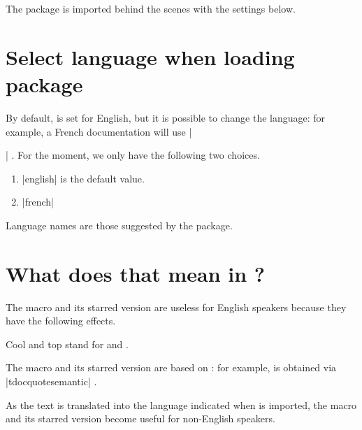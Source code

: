 The  package is imported behind the scenes with the settings below.


\begin{tdoclatex}[code]
\hypersetup{
  colorlinks,
  citecolor = orange!75!black,
  filecolor = orange!75!black,
  linkcolor = orange!75!black,
  urlcolor  = orange!75!black
}
\end{tdoclatex}


\section{Select language when loading package}

By default, \thispack{} is set for English, but it is possible to change the language: for example, a French documentation will use \tdocinlatex|\usepackage[lang = french]{tutodoc}| .
For the moment, we only have the following two choices.

\begin{enumerate}
    \item \tdocinlatex|english| is the default value.

    \item \tdocinlatex|french|
\end{enumerate}


\begin{tdocnote}
    Language names are those suggested by the  package.
\end{tdocnote}


\section{What does that mean in ?}

The macro  and its starred version are useless for English speakers because they have the following effects.


\begin{tdoclatex}
Cool and top stand for  and .
\end{tdoclatex}


The macro  and its starred version are based on  : for example,  is obtained via \tdocinlatex|tdocquote{semantic}| .


\begin{tdocnote}
    As the text  is translated into the language indicated when \thispack{} is imported, the macro  and its starred version become useful for non-English speakers.
\end{tdocnote}


